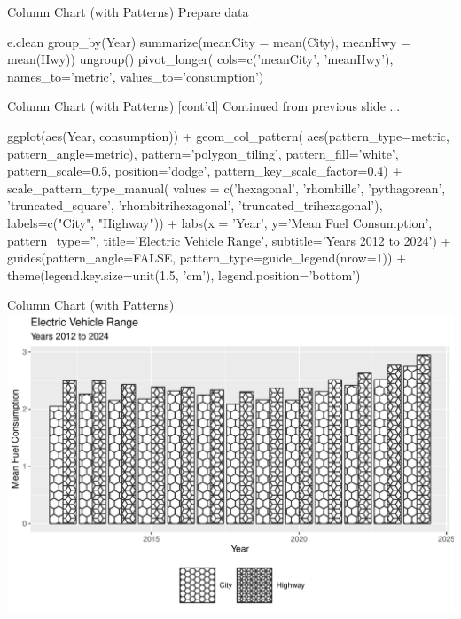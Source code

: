 \documentclass[ignorenonframetext,xcolor=x11names]{beamer}
\begin{document}
\begin{frame}[fragile]{Column Chart (with Patterns)}
Prepare data
\footnotesize
\begin{Rcode}
e.clean %
   group_by(Year) %
   summarize(meanCity = mean(City), 
             meanHwy = mean(Hwy)) %
   ungroup() %
   pivot_longer(
        cols=c('meanCity', 'meanHwy'), 
        names_to='metric', 
        values_to='consumption') %
\end{Rcode}
\end{frame}

\begin{frame}[fragile]{Column Chart (with Patterns) \small [cont'd]}
Continued from previous slide ...
\scriptsize
\begin{Rcode}
ggplot(aes(Year, consumption)) +
  geom_col_pattern(
         aes(pattern_type=metric, pattern_angle=metric),
     pattern='polygon_tiling',
     pattern_fill='white', 
     pattern_scale=0.5,
     position='dodge',
     pattern_key_scale_factor=0.4) +
  scale_pattern_type_manual(
     values = c('hexagonal', 'rhombille', 'pythagorean', 
                'truncated_square', 'rhombitrihexagonal', 
                'truncated_trihexagonal'), 
     labels=c("City", "Highway")) + 
  labs(x = 'Year', y='Mean Fuel Consumption', 
       pattern_type='', 
       title='Electric Vehicle Range', 
       subtitle='Years 2012 to 2024') +
  guides(pattern_angle=FALSE, 
         pattern_type=guide_legend(nrow=1)) + 
  theme(legend.key.size=unit(1.5, 'cm'), 
		legend.position='bottom')
\end{Rcode}
\end{frame}


\begin{frame}{Column Chart (with Patterns)}
  \includegraphics[width=\textwidth]{fuel.columnsPatterns.pdf}
\end{frame}
\end{document}
